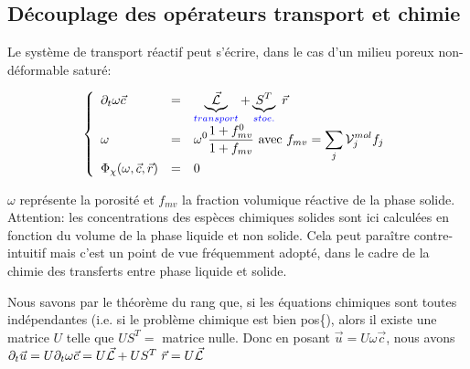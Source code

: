 \begin{appendix}



\section{D\'ecouplage des op\'erateurs transport et chimie}
\label{section-decouplage}

 Le syst\`eme de transport r\'eactif peut s'\'ecrire, dans le cas d'un milieu poreux non-d\'eformable satur\'e:

$$
\left\{
\begin{array}{lcl}
\partial _t \omega \vec{c}  & = &  \displaystyle
 \underbrace{\vec{{\cal L}}}_{\color{blue}transport} + \underbrace{{S}^T}_{\color{blue} stoe.} ~ \vec{r}  \\
\omega  & = & \displaystyle \omega ^0
\frac{1+f_{mv}^0}{1+f_{mv}} \mbox{ avec } f_{mv} = \sum _j {\cal V}_j^{mol} f_j  \\
 \Phi _{\chi}(\omega,\vec{c},\vec{r}) & = & 0 \\
\end{array}
\right.
$$

\bigskip

$\omega $ repr\'esente la porosit\'e et $f_{mv}$ la fraction volumique r\'eactive de la phase solide. Attention: les concentrations des esp\`eces chimiques solides 
sont ici calcul\'ees en fonction du volume de la phase liquide et non solide. Cela peut para\^itre contre-intuitif mais c'est un point de vue fr\'equemment adopt\'e, 
dans le cadre de la chimie des transferts entre phase liquide et solide. 

\bigskip

Nous savons par le th\'eor\`eme du rang que, si les \'equations chimiques sont toutes ind\'ependantes (i.e. si le probl\`eme chimique est bien pos\{), alors il existe une matrice $U$ telle que $US^T = $ matrice nulle.  Donc en posant $\vec{u} = U\omega \vec{c}$, nous avons $\partial _t \vec{u} = U \partial _t \omega \vec{c} = U\vec{\cal L}
+ U{S}^T ~ \vec{r} = U\vec{\cal L}$  


\end{appendix}
